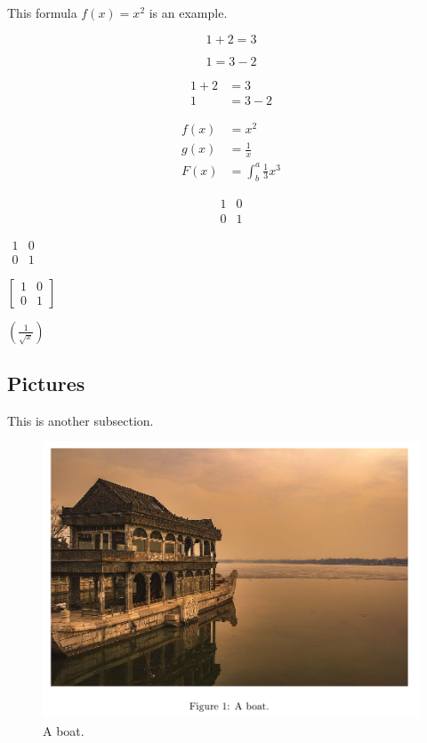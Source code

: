 \documentclass{article}
\begin{document}
	This formula $f(x) = x^2$ is an example.
	
	\begin{equation*}
	1 + 2 = 3
	\end{equation*}
	
	\begin{equation*}
	1 = 3 - 2
	\end{equation*}
	
	\begin{align*}
	1 + 2 &= 3\\
	1 &= 3 -2
	\end{align*}
	
	\begin{align*}
		f(x) & = x^2                     \\
		g(x) & = \frac{1}{x}             \\
		F(x) & = \int^a_b \frac{1}{3}x^3
	\end{align*}
	
	\begin{equation*}
		\begin{matrix}
			1 & 0 \\
			0 & 1
		\end{matrix}
	\end{equation*}	
		
	$\begin{matrix}
		1 & 0\\
		0 & 1
	\end{matrix}$
	
	$\left[
	\begin{matrix}
		1 & 0\\
		0 & 1
	\end{matrix}
	\right]$
	
	$ \left(\frac{1}{\sqrt{x}}\right) $
	
	\subsection{Pictures}
	  This is another subsection.
	  
	\begin{figure}[!ht]
		\includegraphics[width=\linewidth]{source/boat.jpg}
		\caption{A boat.}
		\label{fig:boat1}
	\end{figure}
	
\end{document}
